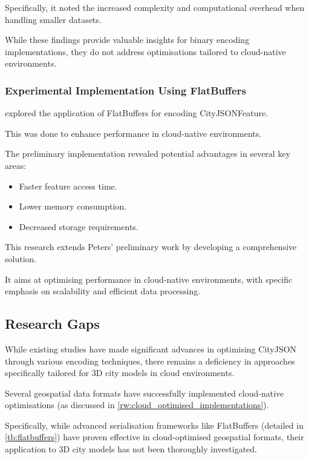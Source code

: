 Specifically, it noted the increased complexity and computational overhead when handling smaller datasets.

While these findings provide valuable insights for binary encoding implementations, they do not address optimisations tailored to cloud-native environments.

\subsubsection{Experimental Implementation Using FlatBuffers}
\label{rw:cityjson_enhancements:performance:flatbuffers}

\citet{ravi_peters_2024_citybuf} explored the application of FlatBuffers \citep{flatbuffers} for encoding CityJSONFeature.

This was done to enhance performance in cloud-native environments.

The preliminary implementation revealed potential advantages in several key areas:

\begin{itemize}
  \item Faster feature access time.
  \item Lower memory consumption.
  \item Decreased storage requirements.
\end{itemize}

This research extends Peters' preliminary work by developing a comprehensive solution.

It aims at optimising performance in cloud-native environments, with specific emphasis on scalability and efficient data processing.

\subsection{Research Gaps}
\label{rw:research_gaps}

While existing studies have made significant advances in optimising CityJSON through various encoding techniques, there remains a deficiency in approaches specifically tailored for 3D city models in cloud environments.

Several geospatial data formats have successfully implemented cloud-native optimisations (as discussed in \autoref{rw:cloud_optimised_implementations}).

Specifically, while advanced serialisation frameworks like FlatBuffers (detailed in \autoref{tb:flatbuffers}) have proven effective in cloud-optimised geospatial formats, their application to 3D city models has not been thoroughly investigated.

